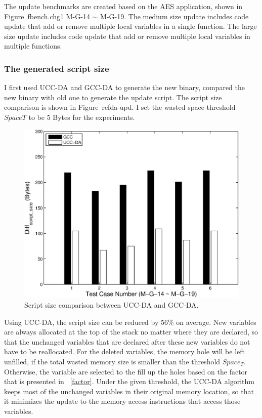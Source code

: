 The update benchmarks are created based on the AES application, 
shown in Figure~{fbench.chg1} M-G-14 $\sim$ M-G-19.
The medium size update includes code update that add or remove multiple
local variables in a single function. The large size update includes code update
that add or remove multiple local variables in multiple functions.


\subsubsection{The generated script size}

I first used UCC-DA and GCC-DA to generate the new binary, compared the
new binary with old one to generate the update script.
The script size comparison is shown in Figure~ref{da-upd}.
I set the wasted space threshold $SpaceT$ to be 5 Bytes for the experiments.

\begin{figure}[htbp]
\centering
\includegraphics[scale=0.6]{./figures/da-upd.eps}
\caption{Script size comparison between UCC-DA and GCC-DA.}
\label{da-upd}
\vspace{-0.1in}
\end{figure}

Using UCC-DA, the script size can be reduced by 56\% on average.
New variables are always allocated at the top of the stack no matter where they are
declared, so that the unchanged variables that are declared after these new variables
do not have to be reallocated.
For the deleted variables, the memory hole will be left unfilled, if the total wasted memory size
 is smaller than the threshold $Space_T$. Otherwise, the variable are selected
 to the fill up the holes based on the factor that is presented in ~\ref{factor}.
 Under the given threshold, the UCC-DA algorithm keeps most of the unchanged variables
in their original memory location, so that it minimizes the update to the memory access instructions
that access those variables.

